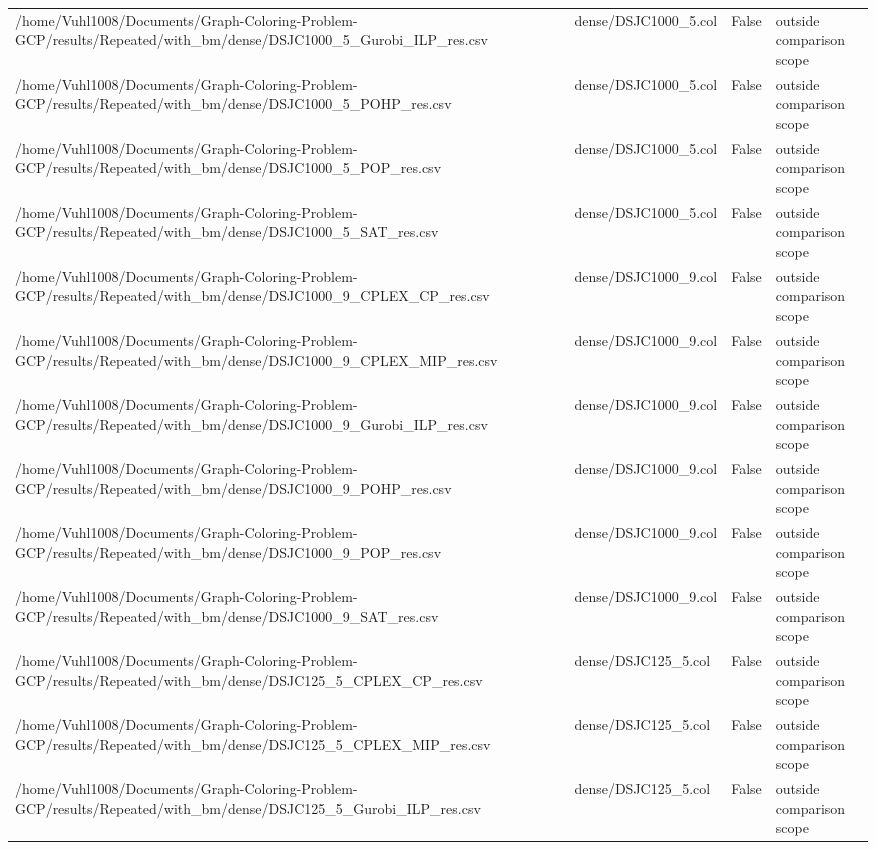 \begin{table}[htbp]
\begin{tabular}{llll}
/home/Vuhl1008/Documents/Graph-Coloring-Problem-GCP/results/Repeated/with\_bm/dense/DSJC1000\_5\_Gurobi\_ILP\_res.csv & dense/DSJC1000\_5.col & False & outside comparison scope \\
/home/Vuhl1008/Documents/Graph-Coloring-Problem-GCP/results/Repeated/with\_bm/dense/DSJC1000\_5\_POHP\_res.csv & dense/DSJC1000\_5.col & False & outside comparison scope \\
/home/Vuhl1008/Documents/Graph-Coloring-Problem-GCP/results/Repeated/with\_bm/dense/DSJC1000\_5\_POP\_res.csv & dense/DSJC1000\_5.col & False & outside comparison scope \\
/home/Vuhl1008/Documents/Graph-Coloring-Problem-GCP/results/Repeated/with\_bm/dense/DSJC1000\_5\_SAT\_res.csv & dense/DSJC1000\_5.col & False & outside comparison scope \\
/home/Vuhl1008/Documents/Graph-Coloring-Problem-GCP/results/Repeated/with\_bm/dense/DSJC1000\_9\_CPLEX\_CP\_res.csv & dense/DSJC1000\_9.col & False & outside comparison scope \\
/home/Vuhl1008/Documents/Graph-Coloring-Problem-GCP/results/Repeated/with\_bm/dense/DSJC1000\_9\_CPLEX\_MIP\_res.csv & dense/DSJC1000\_9.col & False & outside comparison scope \\
/home/Vuhl1008/Documents/Graph-Coloring-Problem-GCP/results/Repeated/with\_bm/dense/DSJC1000\_9\_Gurobi\_ILP\_res.csv & dense/DSJC1000\_9.col & False & outside comparison scope \\
/home/Vuhl1008/Documents/Graph-Coloring-Problem-GCP/results/Repeated/with\_bm/dense/DSJC1000\_9\_POHP\_res.csv & dense/DSJC1000\_9.col & False & outside comparison scope \\
/home/Vuhl1008/Documents/Graph-Coloring-Problem-GCP/results/Repeated/with\_bm/dense/DSJC1000\_9\_POP\_res.csv & dense/DSJC1000\_9.col & False & outside comparison scope \\
/home/Vuhl1008/Documents/Graph-Coloring-Problem-GCP/results/Repeated/with\_bm/dense/DSJC1000\_9\_SAT\_res.csv & dense/DSJC1000\_9.col & False & outside comparison scope \\
/home/Vuhl1008/Documents/Graph-Coloring-Problem-GCP/results/Repeated/with\_bm/dense/DSJC125\_5\_CPLEX\_CP\_res.csv & dense/DSJC125\_5.col & False & outside comparison scope \\
/home/Vuhl1008/Documents/Graph-Coloring-Problem-GCP/results/Repeated/with\_bm/dense/DSJC125\_5\_CPLEX\_MIP\_res.csv & dense/DSJC125\_5.col & False & outside comparison scope \\
/home/Vuhl1008/Documents/Graph-Coloring-Problem-GCP/results/Repeated/with\_bm/dense/DSJC125\_5\_Gurobi\_ILP\_res.csv & dense/DSJC125\_5.col & False & outside comparison scope \\

\end{tabular}
\end{table}
